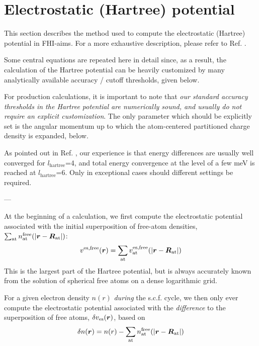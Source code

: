 \section{Electrostatic (Hartree) potential}
\label{Sec:Hartree}

This section describes the method used to compute the
electrostatic (Hartree) potential in FHI-aims. For a more exhaustive
description, please refer to Ref. \cite{Blum08}. 

Some central equations are repeated here in detail since, as a result, the
calculation of the Hartree potential can be heavily customized by many
analytically available accuracy / cutoff thresholds, given below.

For production calculations, it is important to note that \emph{our standard
accuracy thresholds in the Hartree potential are numerically sound,
and usually do not require an explicit customization}. The only
parameter which should be explicitly set is the angular momentum up to
which the atom-centered partitioned charge density is expanded,
 below. 

As pointed out in
Ref. \cite{Blum08}, our experience is that energy differences are
usually well converged for $l_\text{hartree}$=4, and total energy
convergence at the level of a few meV is reached at
$l_\text{hartree}$=6. Only in exceptional cases should different
settings be required. 

---

At the beginning of a calculation, we first compute the electrostatic
potential associated with the initial superposition of free-atom
densities, $\sum_\text{at}
n_\text{at}^\text{free}(|\mbox{\boldmath$r$}-\mbox{\boldmath$R$}_\text{at}|)$:
\begin{equation}
  v^\text{es,free}(\mbox{\boldmath$r$})= \sum_\text{at}
  v_\text{at}^\text{es,free}(|\mbox{\boldmath$r$}-\mbox{\boldmath$R$}_\text{at}|) 
\end{equation}
This is the largest part of the Hartree potential, but is always
accurately known from the solution of spherical free atoms on a dense
logarithmic grid.

For a given electron density $n(r)$ \emph{during} the s.c.f. cycle, we
then only ever compute the electrostatic potential associated with the
\emph{difference} to the superposition of free atoms, $\delta
v_\text{es}(\mbox{\boldmath$r$})$, based on
\begin{equation}
  \delta n(\mbox{\boldmath$r$}) = n(r) - \sum_\text{at}
  n_\text{at}^\text{free}(|\mbox{\boldmath$r$}-\mbox{\boldmath$R$}_\text{at}|)
\end{equation}

